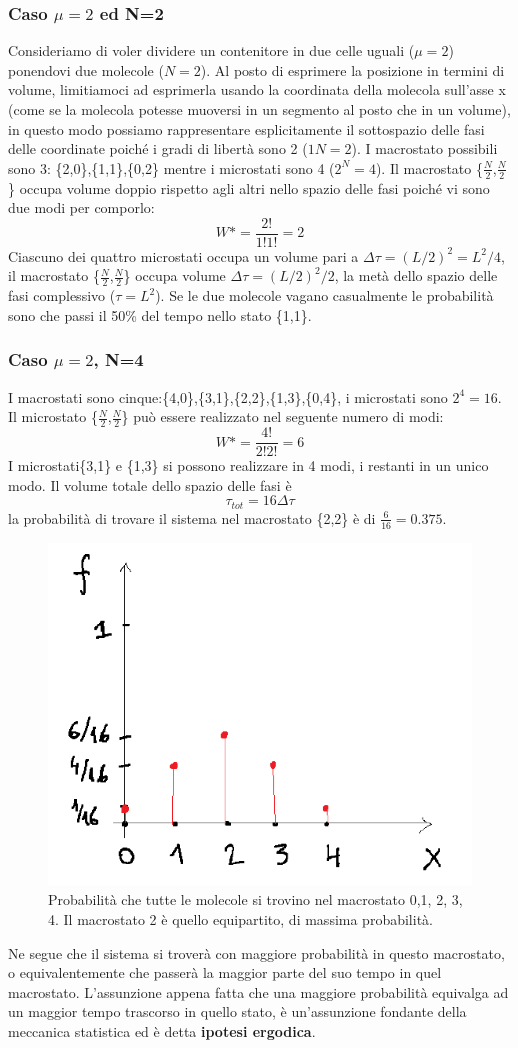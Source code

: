 \documentclass[10pt,a4paper]{article}
\begin{document}
\subsubsection*{Caso $\mu=2$ ed N=2}
Consideriamo di voler dividere un contenitore in due celle uguali ($\mu=2$) ponendovi due molecole (\(N=2\)). Al posto di esprimere la posizione in termini di volume, limitiamoci ad esprimerla usando la coordinata della molecola sull'asse x (come se la molecola potesse muoversi in un segmento al posto che in un volume), in questo modo possiamo rappresentare esplicitamente il sottospazio delle fasi delle coordinate poiché i gradi di libertà sono 2 (\(1N=2\)). I macrostato possibili sono 3: \{2,0\},\{1,1\},\{0,2\} mentre i microstati sono 4 (\(2^N = 4\)). Il macrostato \{$\frac{N}{2}$,$\frac{N}{2}$\} occupa volume doppio rispetto agli altri nello spazio delle fasi poiché vi sono due modi per comporlo:
\[W*=\frac{2!}{1!1!}=2\]
Ciascuno dei quattro microstati occupa un volume pari a \(\Delta\tau = (L/2)^2=L^2/4 \), il macrostato  \{$\frac{N}{2}$,$\frac{N}{2}$\} occupa volume \(\Delta\tau = (L/2)^2/2 \), la metà dello spazio delle fasi complessivo (\(\tau = L^2\)). Se le due molecole vagano casualmente le probabilità sono che passi il 50\% del tempo nello stato \{1,1\}.
\subsubsection*{Caso $\mu=2$, N=4}
I macrostati sono cinque:\{4,0\},\{3,1\},\{2,2\},\{1,3\},\{0,4\}, i microstati sono \(2^4=16\). Il microstato \{$\frac{N}{2}$,$\frac{N}{2}$\} può essere realizzato nel seguente numero di modi:
\[W* = \frac{4!}{2!2!} = 6\]
I microstati\{3,1\} e \{1,3\} si possono realizzare in 4 modi, i restanti in un unico modo. Il volume totale dello spazio delle fasi è 
\[\tau_{tot}=16\Delta\tau \]
la probabilità di trovare il sistema nel macrostato \{2,2\} è di \(\frac{6}{16}=0.375\).
\begin{figure}[h!]
	\centering
	\includegraphics[width=0.4\linewidth]{"../images/caso a 4"}
	\caption{Probabilità che tutte le molecole si trovino nel macrostato 0,1, 2, 3, 4. Il macrostato 2 è quello equipartito, di massima probabilità.}
	\label{fig:caso-a-4}
\end{figure}
Ne segue che il sistema si troverà con maggiore probabilità in questo macrostato, o equivalentemente che passerà la maggior parte del suo tempo in quel macrostato. L'assunzione appena fatta che una maggiore probabilità equivalga ad un maggior tempo trascorso in quello stato, è un'assunzione fondante della meccanica statistica ed è detta \textbf{ipotesi ergodica}. 
\end{document}
